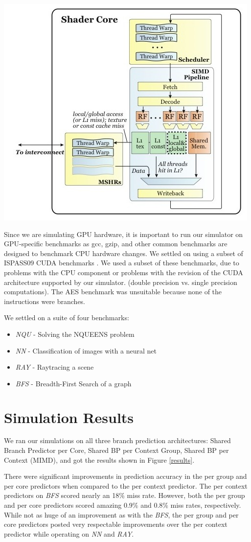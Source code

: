 \documentclass[conference]{IEEEtran}
\begin{document}
\begin{center}
	\includegraphics[width=.45\textwidth]{uarch2.jpg}
\end{center}

Since we are simulating GPU hardware, it is important to run our simulator on GPU-specific benchmarks as gcc, gzip, and other common benchmarks are designed to benchmark CPU hardware changes.  We settled on using a subset of ISPASS09 CUDA benchmarks \cite{ispass09}.  We used a subset of these benchmarks, due to problems with the CPU component or problems with the revision of the CUDA architecture supported by our simulator. (double precision vs. single precision computations).  The AES benchmark was unsuitable because none of the instructions were branches.

We settled on a suite of four benchmarks:

\begin{itemize}
	\item \emph{NQU} - Solving the NQUEENS problem
	\item \emph{NN} - Classification of images with a neural net
	\item \emph{RAY} - Raytracing a scene
	\item \emph{BFS} - Breadth-First Search of a graph
\end{itemize}

\section{Simulation Results}

We ran our simulations on all three branch prediction architectures: Shared Branch Predictor per Core, Shared BP per Context Group, Shared BP per Context (MIMD), and got the results shown in Figure \ref{results}.

There were significant improvements in prediction accuracy in the per group and per core predictors when compared to the per context predictor.  The per context predictors on \emph{BFS} scored nearly an 18\% miss rate.  However, both the per group and per core predictors scored amazing 0.9\% and 0.8\% miss rates, respectively.  While not as huge of an improvement as with the \emph{BFS}, the per group and per core predictors posted very respectable improvements over the per context predictor while operating on \emph{NN} and \emph{RAY}.
\end{document}
